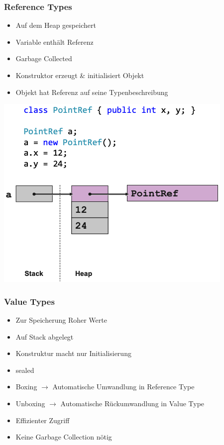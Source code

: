 \subsubsection{Reference Types}

    \begin{itemize}
        \item Auf dem Heap gespeichert
        \item Variable enthält Referenz
        \item Garbage Collected
        \item Konstruktor erzeugt \& initialisiert Objekt
        \item Objekt hat Referenz auf seine Typenbeschreibung
    \end{itemize}
\vspace{-8pt}
\begin{center}
    \includegraphics[scale=0.35]{graphic/grundlagen/Grundlagen_Reference Types.png}
\end{center}
\vspace{-8pt}

\subsubsection{Value Types}

\begin{itemize}
    \item Zur Speicherung Roher Werte
    \item Auf Stack abgelegt
    \item Konstruktur macht nur Initialisierung
    \item sealed
    \item Boxing $\rightarrow$ Automatische Umwandlung in Reference Type
    \item Unboxing $\rightarrow$ Automatische Rückumwandlung in Value Type
    \item Effizienter Zugriff
    \item Keine Garbage Collection nötig
    \end{itemize}

